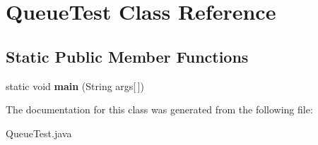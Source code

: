 \hypertarget{class_queue_test}{}\section{Queue\+Test Class Reference}
\label{class_queue_test}
\subsection*{Static Public Member Functions}
\begin{DoxyCompactItemize}
\item 
\hypertarget{class_queue_test_a81ef7af7bee8d1c21cd309da6a49f338}{}static void {\bfseries main} (String args\mbox{[}$\,$\mbox{]})\label{class_queue_test_a81ef7af7bee8d1c21cd309da6a49f338}

\end{DoxyCompactItemize}


The documentation for this class was generated from the following file\+:\begin{DoxyCompactItemize}
\item 
Queue\+Test.\+java\end{DoxyCompactItemize}
